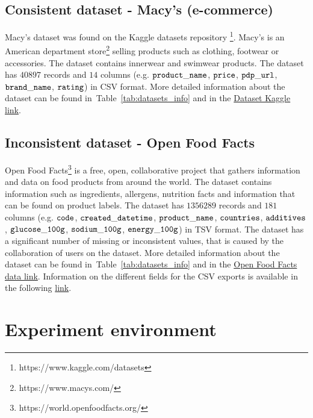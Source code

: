 			\subsection{Consistent dataset - Macy's (e-commerce)}
			\label{subsec:consistent_dataset}
		
				Macy's dataset was found on the Kaggle datasets repository \footnote{https://www.kaggle.com/datasets}. Macy's is an American department store\footnote{https://www.macys.com/} selling products such as clothing, footwear or accessories. The dataset contains innerwear and swimwear products. The dataset has $40897$ records and $14$ columns (e.g. ${\operatorname{\mathtt{product\_name}}}$, ${\operatorname{\mathtt{price}}}$, ${\operatorname{\mathtt{pdp\_url}}}$, ${\operatorname{\mathtt{brand\_name}}}$, ${\operatorname{\mathtt{rating}}}$) in CSV format. More detailed information about the dataset can be found in~Table~\ref{tab:datasets_info} and in the \href{https://www.kaggle.com/PromptCloudHQ/innerwear-data-from-victorias-secret-and-others?select=macys_com.csv}{Dataset Kaggle link}.
						
			\subsection{Inconsistent dataset - Open Food Facts}
			\label{subsec:inconsistent_dataset}
		
				Open Food Facts\footnote{https://world.openfoodfacts.org/} is a free, open, collaborative project that gathers information and data on food products from around the world. The dataset contains information such as ingredients, allergens, nutrition facts and information that can be found on product labels. The dataset has $1356289$ records and $181$ columns (e.g. ${\operatorname{\mathtt{code}}}$, ${\operatorname{\mathtt{created\_datetime}}}$, ${\operatorname{\mathtt{product\_name}}}$, ${\operatorname{\mathtt{countries}}}$, ${\operatorname{\mathtt{additives}}}$, ${\operatorname{\mathtt{glucose\_100g}}}$, ${\operatorname{\mathtt{sodium\_100g}}}$, ${\operatorname{\mathtt{energy\_100g}}}$) in TSV format. The dataset has a significant number of missing or inconsistent values, that is caused by the collaboration of users on the dataset. More detailed information about the dataset can be found in~Table~\ref{tab:datasets_info} and in the \href{https://world.openfoodfacts.org/data}{Open Food Facts data link}. Information on the different fields for the CSV exports is available in the following \href{https://static.openfoodfacts.org/data/data-fields.txt}{link}.
			
	\section{Experiment environment}
	\label{sec:experiment_environment}

